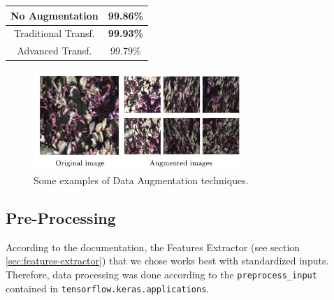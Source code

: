 \documentclass[conference,compsoc,11pt]{IEEEtran}
\begin{document}



\begin{center}
\begin{tabular}{ c c }
\hline\hline
 No Augmentation & 99.86\% \\ 
\hline
 Traditional Transf. & \textbf{99.93\%}  \\  
 Advanced Transf. & 99.79\% \\
\hline\hline
\end{tabular}
\end{center}

\begin{figure}[h!]
\centering
\includegraphics[width=3.1in]{single_augmentation.jpg}
\caption{Some examples of Data Augmentation techniques.}
\label{fig_sim}
\end{figure}

\subsection{Pre-Processing}
According to the documentation, the Features Extractor (see section \ref{sec:features-extractor}) that we chose works best with standardized inputs. Therefore, data processing was done according to the \verb|preprocess_input| contained in \verb|tensorflow.keras.applications|.
\end{document}
